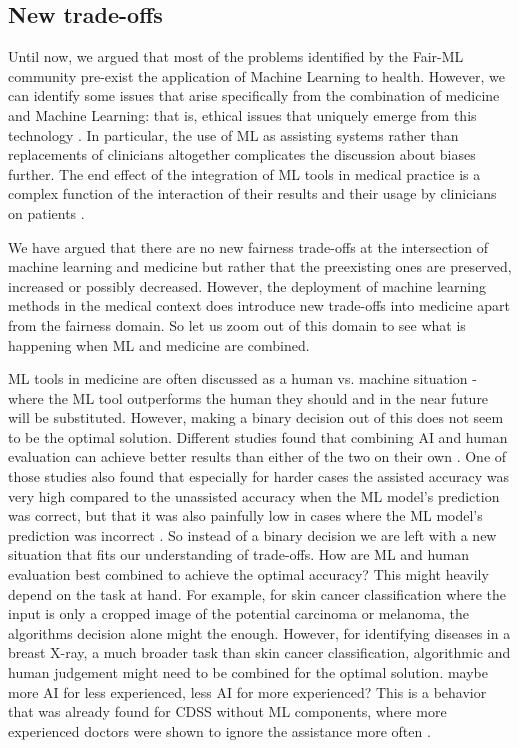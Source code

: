 \subsection{New trade-offs}
    Until now, we argued that most of the problems identified by the Fair-ML community pre-exist the application of Machine Learning to health.
    However, we can identify some issues that arise specifically from the combination of medicine and Machine Learning: that is, ethical issues that uniquely emerge from this technology \cite{Dijkstra2020}.
    In particular, the use of ML as assisting systems rather than replacements of clinicians altogether complicates the discussion about biases further.
    The end effect of the integration of ML tools in medical practice is a complex function of the interaction of their results and their usage by clinicians on patients \cite[p.~4]{Rajkomar2018}.


We have argued that there are no new fairness trade-offs at the intersection of machine learning and medicine but rather that the preexisting ones are preserved, increased or possibly decreased. However, the deployment of machine learning methods in the medical context does introduce new trade-offs into medicine apart from the fairness domain. So let us zoom out of this domain to see what is happening when ML and medicine are combined. 

ML tools in medicine are often discussed as a human vs. machine situation - where the ML tool outperforms the human they should and in the near future will be substituted. However, making a binary decision out of this does not seem to be the optimal solution. Different studies found that combining AI and human evaluation can achieve better results than either of the two on their own \cite{rajpurkar2022ai, kiani2020impact, topol2019high, steiner2018impact}. One of those studies also found that especially for harder cases the assisted accuracy was very high compared to the unassisted accuracy when the ML model's prediction was correct, but that it was also painfully low in cases where the ML model's prediction was incorrect \cite{kiani2020impact}. So instead of a binary decision we are left with a new situation that fits our understanding of trade-offs. How are ML and human evaluation best combined to achieve the optimal accuracy? This might heavily depend on the task at hand. For example, for skin cancer classification where the input is only a cropped image of the potential carcinoma or melanoma, the algorithms decision alone might the enough. However, for identifying diseases in a breast X-ray, a much broader task than skin cancer classification, algorithmic and human judgement might need to be combined for the optimal solution.
 maybe more AI for less experienced, less AI for more experienced? This is a behavior that was already found for CDSS without ML components, where more experienced doctors were shown to ignore the assistance more often \cite{sutton2020overview}.



